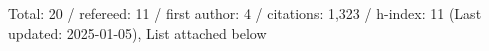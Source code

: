 Total: 20 / refereed: 11 / first author: 4 / citations: 1,323 / h-index: 11 (Last updated: 2025-01-05), List attached below